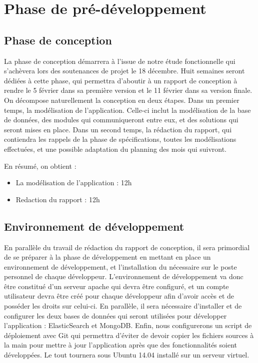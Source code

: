 \section{Phase de pré-développement}
\label{sec:prep_dev}
    \subsection{Phase de conception}
    \label{subsec:conception}
        La phase de conception démarrera à l'issue de notre étude fonctionnelle qui s'achèvera lors des soutenances de projet le 18 décembre. Huit semaines seront dédiées à cette phase, qui permettra d'aboutir à un rapport de conception à rendre le 5 février dans sa première version et le 11 février dans sa version finale. On décompose naturellement la conception en deux étapes. Dans un premier temps, la modélisation de l'application. Celle-ci inclut la modélisation de la base de données, des modules qui communiqueront entre eux, et des solutions qui seront mises en place. Dans un second temps, la rédaction du rapport, qui contiendra les rappels de la phase de spécifications, toutes les modélisations effectuées, et une possible adaptation du planning des mois qui suivront.

        En résumé, on obtient :
        \begin{itemize}
            \item La modélisation de l'application : 12h
            \item Redaction du rapport : 12h
        \end{itemize}

    \subsection{Environnement de développement}
    \label{subsec:env_dev}
        En parallèle du travail de rédaction du rapport de conception, il sera primordial de se préparer à la phase de développement en mettant en place un environnement de développement, et l'installation du nécessaire sur le poste personnel de chaque développeur. L'environnement de développement va donc être constitué d'un serveur apache qui devra être configuré, et un compte utilisateur devra être créé pour chaque développeur afin d'avoir accès et de posséder les droits sur celui-ci. En parallèle, il sera nécessaire d'installer et de configurer les deux bases de données qui seront utilisées pour développer l'application : ElasticSearch et MongoDB. Enfin, nous configurerons un script de déploiement avec Git qui permettra d'éviter de devoir copier les fichiers sources à la main pour mettre à jour l'application après que des fonctionnalités soient développées. Le tout tournera sous Ubuntu 14.04 installé sur un serveur virtuel.

